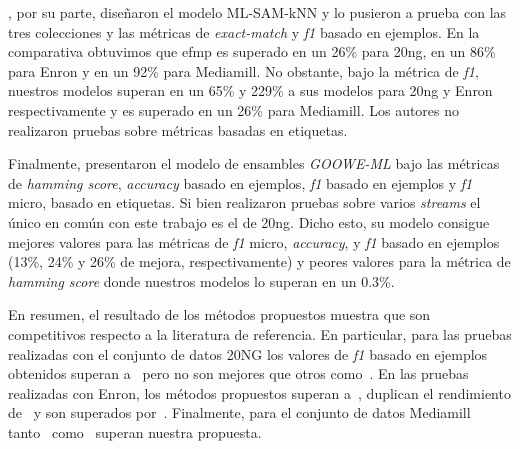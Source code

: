 \citeauthor{roseberry_multi-label_2018}, por su parte, diseñaron el modelo
ML-SAM-kNN y lo pusieron a prueba con las tres colecciones y las métricas de
\textit{exact-match} y \textit{f1} basado en ejemplos. En la comparativa
obtuvimos que \acrshort{efmp} es superado en un 26\% para 20ng, en un 86\% para
Enron y en un 92\% para Mediamill. No obstante, bajo la métrica de \textit{f1},
nuestros modelos superan en un 65\% y 229\% a sus modelos para 20ng y Enron
respectivamente y es superado en un 26\% para Mediamill. Los autores no
realizaron pruebas sobre métricas basadas en etiquetas.

Finalmente, \citeauthor{buyukcakir_novel_2018} presentaron el modelo de
ensambles \textit{GOOWE-ML} bajo las métricas de \textit{hamming score},
\textit{accuracy} basado en ejemplos, \textit{f1} basado en ejemplos y
\textit{f1} micro, basado en etiquetas. Si bien realizaron pruebas sobre varios
\textit{streams} el único en común con este trabajo es el de 20ng. Dicho esto,
su modelo consigue mejores valores para las métricas de \textit{f1} micro,
\textit{accuracy}, y \textit{f1} basado en ejemplos (13\%, 24\% y 26\% de
mejora, respectivamente) y peores valores para la métrica de \textit{hamming
	score} donde nuestros modelos lo superan en un 0.3\%.

En resumen, el resultado de los métodos propuestos muestra que son competitivos
respecto a la literatura de referencia. En particular, para las pruebas
realizadas con el conjunto de datos 20NG los valores de \textit{f1} basado en
ejemplos obtenidos superan a~\cite{osojnik_multi-label_2017} pero no son mejores
que otros como~\cite{sousa_multi-label_2018, buyukcakir_novel_2018,
	roseberry_multi-label_2018}.  En las pruebas realizadas con Enron, los métodos
propuestos superan a~\cite{osojnik_multi-label_2017}, duplican el rendimiento
de~\cite{roseberry_multi-label_2018} y son superados
por~\cite{sousa_multi-label_2018}. Finalmente, para el conjunto de datos
Mediamill tanto~\cite{sousa_multi-label_2018}
como~\cite{roseberry_multi-label_2018} superan nuestra propuesta.


